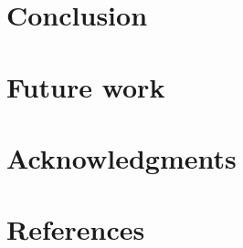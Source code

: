 \documentclass[review]{elsarticle}
\begin{document}


\section{Conclusion}



\section{Future work}



\section{Acknowledgments}



\section*{References}


\end{document}
